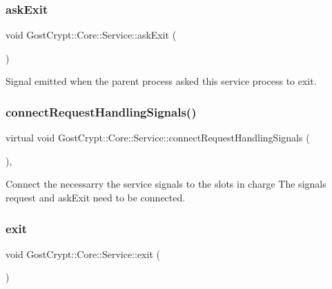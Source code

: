\subsubsection{\texorpdfstring{ask\+Exit}{askExit}}
{\footnotesize\ttfamily void Gost\+Crypt\+::\+Core\+::\+Service\+::ask\+Exit (\begin{DoxyParamCaption}{ }\end{DoxyParamCaption})\hspace{0.3cm}{\ttfamily [signal]}}



Signal emitted when the parent process asked this service process to exit. 

\mbox{\label{class_gost_crypt_1_1_core_1_1_service_a9982bf1e986cd98b42920272cd73fb8c}} 
\subsubsection{\texorpdfstring{connect\+Request\+Handling\+Signals()}{connectRequestHandlingSignals()}}
{\footnotesize\ttfamily virtual void Gost\+Crypt\+::\+Core\+::\+Service\+::connect\+Request\+Handling\+Signals (\begin{DoxyParamCaption}{ }\end{DoxyParamCaption})\hspace{0.3cm}{\ttfamily [protected]}, {}}



Connect the necessarry the service signals to the slots in charge The signals request and ask\+Exit need to be connected. 

\mbox{\label{class_gost_crypt_1_1_core_1_1_service_abd102ab9aa1e06bd9059af46996cb513}} 
\subsubsection{\texorpdfstring{exit}{exit}}
{\footnotesize\ttfamily void Gost\+Crypt\+::\+Core\+::\+Service\+::exit (\begin{DoxyParamCaption}{ }\end{DoxyParamCaption})\hspace{0.3cm}{\ttfamily [signal]}}



